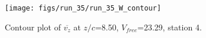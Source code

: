 \begin{figure}[H]
\centering
\texttt{[image: figs/run\_35/run\_35\_W\_contour]}
\caption{Contour plot of $\overline{v_{z}}$ at $z/c$=8.50, $V_{free}$=23.29, station 4.}
\label{fig:run_35_W_contour}
\end{figure}


